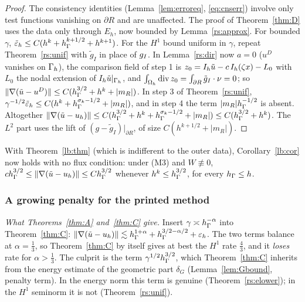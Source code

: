 \begin{proof}
The consistency identities (Lemma~\ref{lem:erroreq}, \eqref{eq:cnserr}) involve only test functions vanishing on $\partial R$ and are unaffected. The proof of Theorem~\ref{thm:D} uses the data only through $E_h$, now bounded by Lemma~\ref{rs:approx}. For bounded $\gamma$, $\tilde\varepsilon_h\le C(h^k+h_\Gamma^{k+1/2}+h^{k+1})$. For the $H^1$ bound uniform in $\gamma$, repeat Theorem~\ref{rs:unif} with $\tilde g_I$ in place of $g_I$. In Lemma~\ref{rs:dir} now $a=0$ ($u^D$ vanishes on $\Gamma_h$), the comparison field of step 1 is $z_0=I_h\tilde u-c\,I_h(\zeta x)-L_0$ with $L_0$ the nodal extension of $I_h\tilde u|_{\Gamma_h}$, and $\int_{\Omega_h}\operatorname{div} z_0=\int_{\partial R}\tilde g_I\cdot\nu=0$; so $\lVert \nabla(\tilde u-u^D)\rVert\le C(h_\Gamma^{3/2}+h^k+|m_R|)$. In step 3 of Theorem~\ref{rs:unif}, $\gamma^{-1/2}\tilde\varepsilon_h\le C(h^k+h_\Gamma^{\sigma_k-1/2}+|m_R|)$, and in step 4 the term $|m_R|h_\Gamma^{-1/2}$ is absent. Altogether $\lVert \nabla(\tilde u-u_h)\rVert\le C(h_\Gamma^{3/2}+h^k+h_\Gamma^{\sigma_k-1/2}+|m_R|)\le C(h_\Gamma^{3/2}+h^k)$. The $L^2$ part uses the lift of $(g-\tilde g_I)|_{\partial R}$, of size $C(h^{k+1/2}+|m_R|)$.
\end{proof}

With Theorem~\ref{lb:thm} (which is indifferent to the outer data), Corollary~\ref{lb:cor} now holds with no flux condition: under (M3) and $W\not\equiv0$, $ch_\Gamma^{3/2}\le\lVert \nabla(\tilde u-u_h)\rVert\le Ch_\Gamma^{3/2}$ whenever $h^k\le h_\Gamma^{3/2}$, for every $h_\Gamma\le h$.

\subsubsection{A growing penalty for the printed method}

\emph{What Theorems~\ref{thm:A} and~\ref{thm:C} give.} Insert $\gamma\asymp h_\Gamma^{-\alpha}$ into Theorem~\ref{thm:C}: $\lVert \nabla(\tilde u-u_h)\rVert\lesssim h_\Gamma^{1+\alpha}+h_\Gamma^{3/2-\alpha/2}+\varepsilon_h$. The two terms balance at $\alpha=\frac13$, so Theorem~\ref{thm:C} by itself gives at best the $H^1$ rate $\frac43$, and it \emph{loses} rate for $\alpha>\frac13$. The culprit is the term $\gamma^{1/2}h_\Gamma^{3/2}$, which Theorem~\ref{thm:C} inherits from the energy estimate of the geometric part $\delta_G$ (Lemma~\ref{lem:Gbound}, penalty term). In the energy norm this term is genuine (Theorem~\ref{rs:elower}); in the $H^1$ seminorm it is not (Theorem~\ref{rs:unif}).

